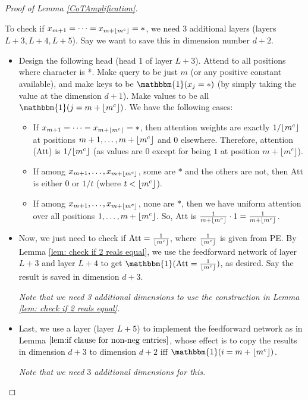 \documentclass{article}
\theoremstyle{definition}
\DeclarePairedDelimiter{\floor}{\lfloor}{\rfloor}
\newcommand{\0}{\mathbf{0}}
\newcommand{\1}{\mathbbm{1}}
\newcommand{\Att}{\text{Att}}
\begin{document}
\begin{proof}[Proof of Lemma \ref{CoTAmplification}]
\begin{itemize}[noitemsep, leftmargin=10pt, topsep=0pt]
        To check if $x_{m+1} = \dots = x_{m+\floor{m^c}} = *$, we need 3 additional layers (layers $L+3, L+4, L+5$). Say we want to save this in dimension number $d+2$.
        \begin{itemize}
            \item Design the following head (head 1 of layer $L+3$). Attend to all positions where character is *. Make query to be just $m$ (or any positive constant available), and make keys to be $\1(x_j = *)$ (by simply taking the value at the dimension $d+1$). Make values to be all $\1(j = m+\floor{m^c})$. We have the following cases: 
            \begin{itemize}
                \item If $x_{m+1} = \dots = x_{m + \floor{m^c}} = *$, then attention weights are exactly $1/\floor{m^c}$ at positions $m+1, \dots, m+\floor{m^c}$ and $0$ elsewhere. Therefore, attention (Att) is $1/\floor{m^c}$ (as values are $0$ except for being $1$ at position $m + \lfloor m^c \rfloor$). 
                \item If among $x_{m+1}, \dots, x_{m+\floor{m^c}}$, some are $*$ and the others are not, then Att is either $0$ or $1/t$ (where $t < \floor{m^c}$). 
                \item  If among $x_{m+1}, \dots, x_{m+\floor{m^c}}$, none are $*$, then we have uniform attention over all positions $1, \dots, m + \floor{m^c}$. So, Att is $\frac{1}{m + \floor{m^c}} \cdot 1 = \frac{1}{m + \floor{m^c}}$. 
            \end{itemize}

            \item Now, we just need to check if $\Att = \frac{1}{\floor{m^c}}$, where $\frac{1}{\floor{m^c}}$ is given from PE. By Lemma \ref{lem: check if 2 reals equal}, we use the feedforward network of layer $L+3$ and layer $L+4$ to get $\1(\Att = \frac{1}{\floor{m^c}})$, as desired. Say the result is saved in dimension $d+3$.

            \textit{Note that we need 3 additional dimensions to use the construction in Lemma \ref{lem: check if 2 reals equal}.} 

            \item Last, we use a layer (layer $L+5$) to implement the feedforward network as in Lemma $\ref{lem:if clause for non-neg entries}$, whose effect is to copy the results in dimension $d+3$ to dimension $d+2$ iff $\1(i = m + \floor{m^c})$. 

            \textit{Note that we need $3$ additional dimensions for this.}
        \end{itemize}
        

\end{itemize}
\end{proof}
\end{document}

